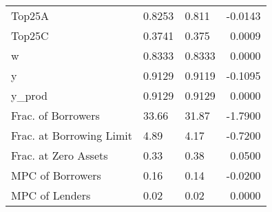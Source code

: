 \begin{table}
\begin{tabular}{lllr}
                  Top25A &  0.8253 &    0.811 &  -0.0143 \\
                  Top25C &  0.3741 &    0.375 &   0.0009 \\
                       w &  0.8333 &   0.8333 &   0.0000 \\
                       y &  0.9129 &   0.9119 &  -0.1095 \\
                  y\_prod &  0.9129 &   0.9129 &   0.0000 \\
      Frac. of Borrowers &   33.66 &    31.87 &  -1.7900 \\
Frac. at Borrowing Limit &    4.89 &     4.17 &  -0.7200 \\
    Frac. at Zero Assets &    0.33 &     0.38 &   0.0500 \\
        MPC of Borrowers &    0.16 &     0.14 &  -0.0200 \\
          MPC of Lenders &    0.02 &     0.02 &   0.0000 \\
\bottomrule
\end{tabular}
\end{table}
